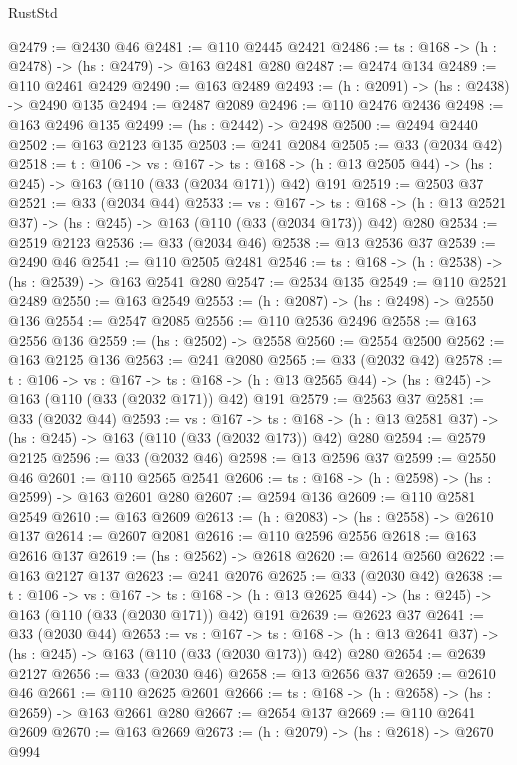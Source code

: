 \begin{lexlean}{RustStd}
\begin{coremodule}
@2479 := @2430 @46
@2481 := @110 @2445 @2421
@2486 := {ts : @168} -> (h : @2478) -> (hs : @2479) -> @163 @2481 @280
@2487 := @2474 @134
@2489 := @110 @2461 @2429
@2490 := @163 @2489
@2493 := (h : @2091) -> (hs : @2438) -> @2490 @135
@2494 := @2487 @2089
@2496 := @110 @2476 @2436
@2498 := @163 @2496 @135
@2499 := (hs : @2442) -> @2498
@2500 := @2494 @2440
@2502 := @163 @2123 @135
@2503 := @241 @2084
@2505 := @33 (@2034 @42)
@2518 := {t : @106} ->
  {vs : @167} ->
  {ts : @168} -> (h : @13 @2505 @44) -> (hs : @245) -> @163 (@110 (@33 (@2034 @171)) @42) @191
@2519 := @2503 @37
@2521 := @33 (@2034 @44)
@2533 := {vs : @167} ->
  {ts : @168} -> (h : @13 @2521 @37) -> (hs : @245) -> @163 (@110 (@33 (@2034 @173)) @42) @280
@2534 := @2519 @2123
@2536 := @33 (@2034 @46)
@2538 := @13 @2536 @37
@2539 := @2490 @46
@2541 := @110 @2505 @2481
@2546 := {ts : @168} -> (h : @2538) -> (hs : @2539) -> @163 @2541 @280
@2547 := @2534 @135
@2549 := @110 @2521 @2489
@2550 := @163 @2549
@2553 := (h : @2087) -> (hs : @2498) -> @2550 @136
@2554 := @2547 @2085
@2556 := @110 @2536 @2496
@2558 := @163 @2556 @136
@2559 := (hs : @2502) -> @2558
@2560 := @2554 @2500
@2562 := @163 @2125 @136
@2563 := @241 @2080
@2565 := @33 (@2032 @42)
@2578 := {t : @106} ->
  {vs : @167} ->
  {ts : @168} -> (h : @13 @2565 @44) -> (hs : @245) -> @163 (@110 (@33 (@2032 @171)) @42) @191
@2579 := @2563 @37
@2581 := @33 (@2032 @44)
@2593 := {vs : @167} ->
  {ts : @168} -> (h : @13 @2581 @37) -> (hs : @245) -> @163 (@110 (@33 (@2032 @173)) @42) @280
@2594 := @2579 @2125
@2596 := @33 (@2032 @46)
@2598 := @13 @2596 @37
@2599 := @2550 @46
@2601 := @110 @2565 @2541
@2606 := {ts : @168} -> (h : @2598) -> (hs : @2599) -> @163 @2601 @280
@2607 := @2594 @136
@2609 := @110 @2581 @2549
@2610 := @163 @2609
@2613 := (h : @2083) -> (hs : @2558) -> @2610 @137
@2614 := @2607 @2081
@2616 := @110 @2596 @2556
@2618 := @163 @2616 @137
@2619 := (hs : @2562) -> @2618
@2620 := @2614 @2560
@2622 := @163 @2127 @137
@2623 := @241 @2076
@2625 := @33 (@2030 @42)
@2638 := {t : @106} ->
  {vs : @167} ->
  {ts : @168} -> (h : @13 @2625 @44) -> (hs : @245) -> @163 (@110 (@33 (@2030 @171)) @42) @191
@2639 := @2623 @37
@2641 := @33 (@2030 @44)
@2653 := {vs : @167} ->
  {ts : @168} -> (h : @13 @2641 @37) -> (hs : @245) -> @163 (@110 (@33 (@2030 @173)) @42) @280
@2654 := @2639 @2127
@2656 := @33 (@2030 @46)
@2658 := @13 @2656 @37
@2659 := @2610 @46
@2661 := @110 @2625 @2601
@2666 := {ts : @168} -> (h : @2658) -> (hs : @2659) -> @163 @2661 @280
@2667 := @2654 @137
@2669 := @110 @2641 @2609
@2670 := @163 @2669
@2673 := (h : @2079) -> (hs : @2618) -> @2670 @994

\end{coremodule}
\end{lexlean}
